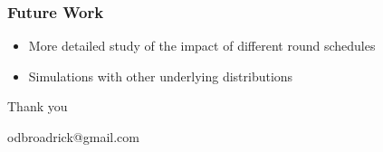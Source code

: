 \documentclass{beamer}
\begin{document}
\begin{frame}
\frametitle{Future Work}
\begin{itemize}
\item More detailed study of the impact of different round schedules
\pause
\item Simulations with other underlying distributions
\end{itemize}
\end{frame}


\begin{frame}
\centering 
\bigskip
\bigskip
\bigskip
Thank you

\bigskip
\bigskip
\bigskip
\bigskip

odbroadrick@gmail.com
\end{frame}



\end{document}
